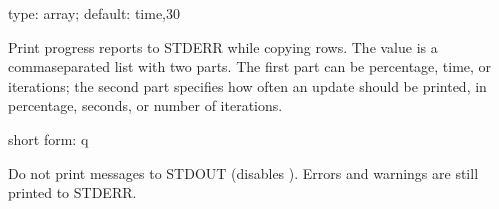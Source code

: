 \documentclass[letterpaper,10pt,english]{sphinxmanual}
\begin{document}
\begin{fulllineitems}
\label{\detokenize{mariadb-schema-change:cmdoption-mariadb-schema-change-progress}}
\sphinxAtStartPar
type: array; default: time,30

\sphinxAtStartPar
Print progress reports to STDERR while copying rows.  The value is a
comma\sphinxhyphen{}separated list with two parts.  The first part can be percentage, time, or
iterations; the second part specifies how often an update should be printed, in
percentage, seconds, or number of iterations.

\end{fulllineitems}


\begin{fulllineitems}
\label{\detokenize{mariadb-schema-change:cmdoption-mariadb-schema-change-quiet}}
\sphinxAtStartPar
short form: \sphinxhyphen{}q

\sphinxAtStartPar
Do not print messages to STDOUT (disables {\hyperref[\detokenize{mariadb-schema-change:cmdoption-mariadb-schema-change-progress}]{}}).
Errors and warnings are still printed to STDERR.

\end{fulllineitems}

\end{document}
